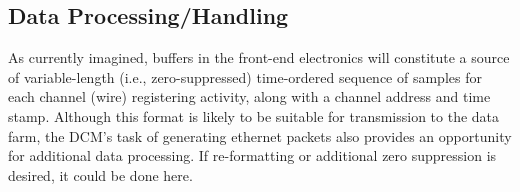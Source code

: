 \subsection{Data Processing/Handling}

As currently imagined, buffers in the front-end electronics will constitute  
a source of variable-length (i.e., zero-suppressed) time-ordered sequence 
of samples for each channel (wire) registering activity, along with a 
channel address and time stamp.  Although this format is likely to be 
suitable for transmission to the data farm, the DCM's task of generating 
ethernet packets also provides an opportunity for additional data processing.  
If re-formatting or additional zero suppression is desired, 
it could be done here.   



%

